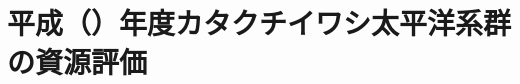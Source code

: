 \chapter{平成\ThisYrJp（\ThisYr）年度カタクチイワシ太平洋系群の資源評価}
%











\clearpage

%
\setcounter{chapter}{0}
